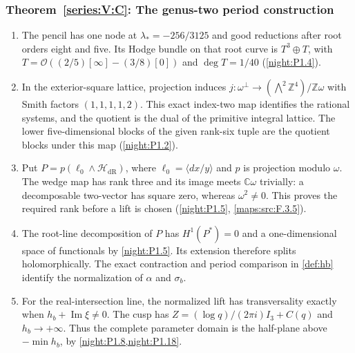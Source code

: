 \subsubsection*{Theorem~\ref{series:V:C}: The genus-two period construction}
\begin{enumerate}[label=\arabic*.,leftmargin=*]
\item\hypertarget{step-V-C-1}{} The pencil has one node at $\lambda_*=-256/3125$ and good
  reductions after root orders eight and five.  Its Hodge bundle on
  that root curve is $T^3\oplus T$, with
  $T=\mathcal O((2/5)[\infty]-(3/8)[0])$ and
  $\deg T=1/40$ (\cref{night:P1.4}).

\item\hypertarget{step-V-C-2}{} In the exterior-square lattice, projection induces
  $j:\omega^\perp\to(\bigwedge^2\mathbb Z^4)/\mathbb Z\omega$
  with Smith factors $(1,1,1,1,2)$.  This exact index-two map identifies
  the rational systems, and the quotient is the dual of the primitive
  integral lattice.  The lower five-dimensional blocks of the given
  rank-six tuple are the quotient blocks under this map
  (\cref{night:P1.2}).

\item\hypertarget{step-V-C-3}{} Put $P=p(\ell_0\wedge\mathcal H_{\mathrm{dR}})$, where
  $\ell_0=\langle dx/y\rangle$ and $p$ is projection modulo $\omega$.
  The wedge map has rank three and its image meets $\mathbb C\omega$
  trivially: a decomposable two-vector has square zero, whereas
  $\omega^2\ne0$.  This proves the required rank before a lift is
  chosen (\cref{night:P1.5}, \cref{maps:src:F.3.5}).

\item\hypertarget{step-V-C-4}{} The root-line decomposition of $P$ has $H^1(P^*)=0$ and a one-dimensional space of functionals by \cref{night:P1.5}. Its extension therefore splits holomorphically. The exact contraction and period comparison in \cref{def:hb} identify the normalization of $\alpha$ and $\sigma_b$.

\item\hypertarget{step-V-C-5}{} For the real-intersection line, the normalized lift has transversality exactly when $h_b+\operatorname{Im}\xi\ne0$. The cusp has $Z=(\log q)/(2\pi i)I_3+C(q)$ and $h_b\to+\infty$. Thus the complete parameter domain is the half-plane above $-\min h_b$, by \cref{night:P1.8,night:P1.18}.

\end{enumerate}

\hypertarget{outline-V-B}{}
